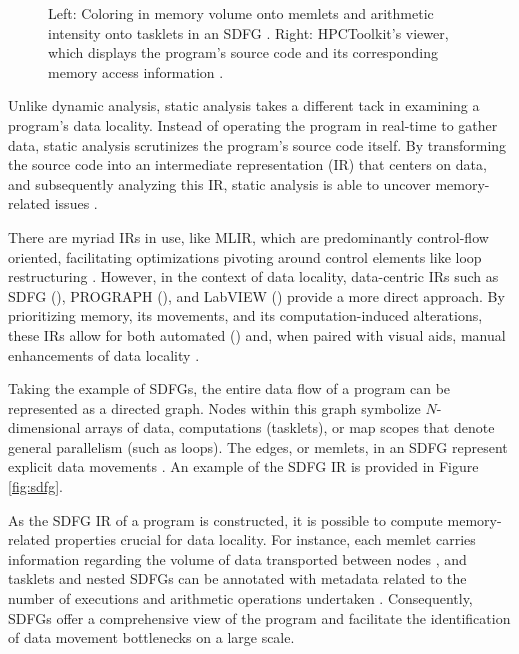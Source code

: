 \begin{figure}
\begin{subfigure}[c]{.68\textwidth}
	\end{subfigure}
	\caption{Left: Coloring in memory volume onto memlets and arithmetic intensity onto tasklets in an SDFG \cite{schaad2021boosting}. Right: HPCToolkit's viewer, which displays the program's source code and its corresponding memory access information \cite{adhianto2010hpctoolkit}.}
	\label{fig:coarse}
\end{figure}

Unlike dynamic analysis, static analysis takes a different tack in examining a program's data locality. Instead of operating the program in real-time to gather data, static analysis scrutinizes the program's source code itself. By transforming the source code into an intermediate representation (IR) that centers on data, and subsequently analyzing this IR, static analysis is able to uncover memory-related issues \cite{schaad2022boosting,schaad2021boosting,calotoiu2022lifting,ben2023bridging}.

There are myriad IRs in use, like MLIR, which are predominantly control-flow oriented, facilitating optimizations pivoting around control elements like loop restructuring \cite{moses2021polygeist}. However, in the context of data locality, data-centric IRs such as SDFG (\cite{ben2019statefulSDFG}), PROGRAPH (\cite{matwin1985prograph}), and LabVIEW (\cite{kodosky2020labview}) provide a more direct approach. By prioritizing memory, its movements, and its computation-induced alterations, these IRs allow for both automated (\cite{ben2019statefulSDFG}) and, when paired with visual aids, manual enhancements of data locality \cite{ben2023bridging,ben2019statefulSDFG,schaad2021boosting}.

Taking the example of SDFGs, the entire data flow of a program can be represented as a directed graph. Nodes within this graph symbolize $N$-dimensional arrays of data, computations (tasklets), or map scopes that denote general parallelism (such as loops). The edges, or memlets, in an SDFG represent explicit data movements \cite{ben2019statefulSDFG}. An example of the SDFG IR is provided in Figure \ref{fig:sdfg}.

As the SDFG IR of a program is constructed, it is possible to compute memory-related properties crucial for data locality. For instance, each memlet carries information regarding the volume of data transported between nodes \cite{ben2019statefulSDFG}, and tasklets and nested SDFGs can be annotated with metadata related to the number of executions and arithmetic operations undertaken \cite{schaad2021boosting}. Consequently, SDFGs offer a comprehensive view of the program and facilitate the identification of data movement bottlenecks on a large scale.

